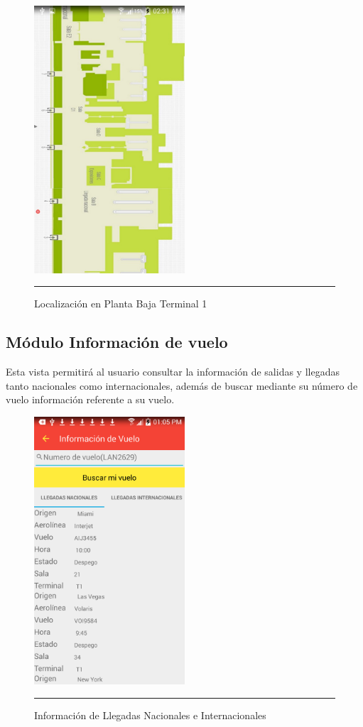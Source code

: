 \begin{figure}[h]
	\centering
		\includegraphics[width=0.5\textwidth]{Figuras/ubikpb.jpg}
		\rule{30em}{0.5pt}
	\caption[Localización en Planta Baja Terminal 1]{Localización en Planta Baja Terminal 1}
	\label{fig:indoorPB}
\end{figure}
\clearpage

\subsection{Módulo Información de vuelo}
Esta vista permitirá al usuario consultar la información de salidas y llegadas tanto nacionales como internacionales, 
además de buscar mediante su número de vuelo información referente a su vuelo.

\begin{figure}[h]
	\centering
		\includegraphics[width=0.5\textwidth]{Figuras/llegadas.png}
		\rule{30em}{0.5pt}
	\caption[Información de Llegadas Nacionales e Internacionales]{Información de Llegadas Nacionales e Internacionales}
	\label{fig:infoLlegadas}
\end{figure}

